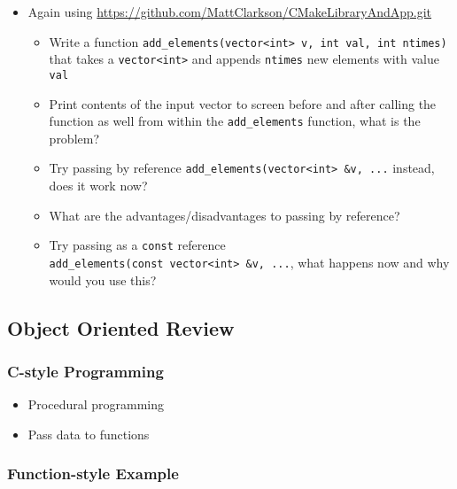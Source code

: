 \begin{itemize}
\tightlist
\item
  Again using
  \url{https://github.com/MattClarkson/CMakeLibraryAndApp.git}

  \begin{itemize}
  \tightlist
  \item
    Write a function
    \texttt{add\_elements(vector\textless{}int\textgreater{}\ v,\ int\ val,\ int\ ntimes)}
    that takes a \texttt{vector\textless{}int\textgreater{}} and appends
    \texttt{ntimes} new elements with value \texttt{val}\\
  \item
    Print contents of the input vector to screen before and after
    calling the function as well from within the \texttt{add\_elements}
    function, what is the problem?
  \item
    Try passing by reference
    \texttt{add\_elements(vector\textless{}int\textgreater{}\ \&v,\ ...}
    instead, does it work now?
  \item
    What are the advantages/disadvantages to passing by reference?
  \item
    Try passing as a \texttt{const} reference
    \texttt{add\_elements(const\ vector\textless{}int\textgreater{}\ \&v,\ ...},
    what happens now and why would you use this?
  \end{itemize}
\end{itemize}

\hypertarget{object-oriented-review}{%
\subsection{Object Oriented Review}\label{object-oriented-review}}

\hypertarget{c-style-programming}{%
\subsubsection{C-style Programming}\label{c-style-programming}}

\begin{itemize}
\tightlist
\item
  Procedural programming
\item
  Pass data to functions
\end{itemize}

\hypertarget{function-style-example}{%
\subsubsection{Function-style Example}\label{function-style-example}}

